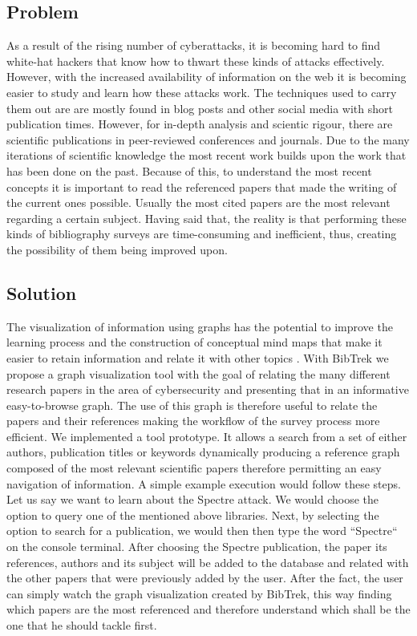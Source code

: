\documentclass[twocolumn]{article}
\begin{document}
\subsection{Problem}
As a result of the rising number of cyberattacks, it is becoming hard to find white-hat hackers that know how to thwart these kinds of attacks effectively. However, with the increased availability of information on the web it is becoming easier to study and learn how these attacks work. The techniques used to carry them out are are mostly found in blog posts and other social media with short publication times. However, for in-depth analysis and scientic rigour, there are scientific publications in peer-reviewed conferences and journals. Due to the many iterations of scientific knowledge the most recent work builds upon the work that has been done on the past. Because of this, to understand the most recent concepts it is important to read the referenced papers that made the writing of the current ones possible. Usually the most cited papers are the most relevant regarding a certain subject. Having said that, the reality is that performing these kinds of bibliography surveys are time-consuming and inefficient, thus, creating the possibility of them being improved upon.

\subsection{Solution}
The visualization of information using graphs has the potential to improve the learning process and the construction of conceptual mind maps that make it easier to retain information and relate it with other topics \cite{enhancinglearningwithvisualizationtechniques}. With BibTrek we propose a graph visualization tool with the goal of relating the many different research papers in the area of cybersecurity and presenting that in an informative easy-to-browse graph. The use of this graph is therefore useful to relate the papers and their references making the workflow of the survey process more efficient. We implemented a tool prototype. It allows a search from a set of either authors, publication titles or keywords dynamically producing a reference graph composed of the most relevant scientific papers therefore permitting an easy navigation of information. A simple example execution would follow these steps. Let us say we want to learn about the Spectre attack. We would choose the option to query one of the mentioned above libraries. Next, by selecting the option to search for a publication, we would then then type the word ``Spectre`` on the console terminal. After choosing the Spectre publication, the paper its references, authors and its subject will be added to the database and related with the other papers that were previously added by the user. After the fact, the user can simply watch the graph visualization created by BibTrek, this way finding which papers are the most referenced and therefore understand which shall be the one that he should tackle first.
\end{document}
